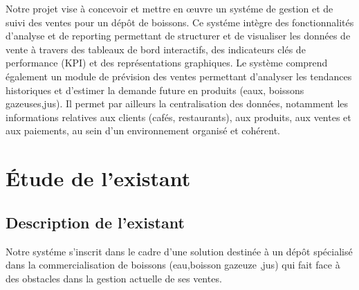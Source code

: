 Notre projet vise à concevoir et mettre en œuvre un systéme de gestion et
de suivi des ventes pour un dépôt de boissons. Ce systéme intègre des
fonctionnalités d'analyse et de reporting permettant de structurer et de visualiser
les données de vente à travers des tableaux de bord interactifs, des indicateurs
clés de performance (KPI) et des représentations graphiques. Le système comprend
également un module de prévision des ventes permettant d'analyser les tendances
historiques et d'estimer la demande future en produits (eaux, boissons gazeuses,jus).
Il permet par ailleurs la centralisation des données, notamment les informations
relatives aux clients (cafés, restaurants), aux produits, aux ventes
et aux paiements, au sein d'un environnement organisé et cohérent.

\section{Étude de l'existant}

\subsection{Description de l'existant}

Notre systéme s'inscrit dans le cadre d'une solution destinée à un dépôt
spécialisé dans la commercialisation de boissons (eau,boisson gazeuze ,jus) qui fait face à des obstacles
dans la gestion actuelle de ses ventes.


